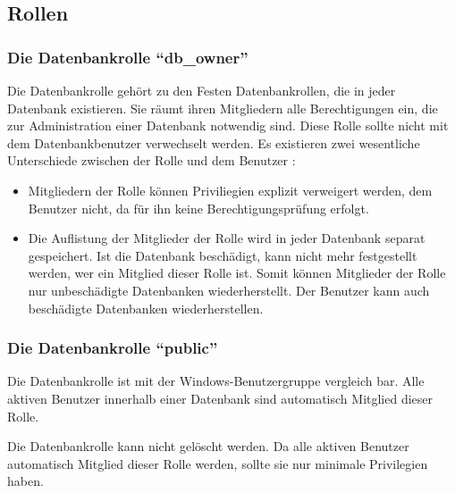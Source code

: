       \subsection{Rollen}
        \subsubsection{Die Datenbankrolle \enquote{db\_owner}}
          Die Datenbankrolle  gehört zu den Festen
          Datenbankrollen, die in jeder Datenbank existieren. Sie räumt ihren
          Mitgliedern alle Berechtigungen ein, die zur Administration einer
          Datenbank notwendig sind. Diese Rolle sollte nicht mit dem
          Datenbankbenutzer  verwechselt werden. Es existieren
          zwei wesentliche Unterschiede zwischen der Rolle
           und dem Benutzer :
          \begin{itemize}
            \item Mitgliedern der Rolle  können
            Priviliegien explizit verweigert werden, dem Benutzer 
            nicht, da für ihn keine Berechtigungsprüfung erfolgt.
            \item Die Auflistung der Mitglieder der Rolle 
            wird in jeder Datenbank separat gespeichert. Ist die Datenbank
            beschädigt, kann nicht mehr festgestellt werden, wer ein Mitglied
            dieser Rolle ist. Somit können Mitglieder der Rolle
             nur unbeschädigte Datenbanken
            wiederherstellt. Der Benutzer  kann auch beschädigte
            Datenbanken wiederherstellen.
          \end{itemize} 
          \begin{literaturinternet}
            \item \cite{gc20110407msdvdo}
          \end{literaturinternet}
        \subsubsection{Die Datenbankrolle \enquote{public}}
          Die Datenbankrolle  ist mit der
          Windows-Benutzergruppe  vergleich bar. Alle aktiven
          Benutzer innerhalb einer Datenbank sind automatisch Mitglied dieser
          Rolle.
          \begin{merke}
            Die Datenbankrolle  kann nicht gelöscht werden.
            Da alle aktiven Benutzer automatisch Mitglied dieser Rolle
            werden, sollte sie nur minimale Privilegien haben.
          \end{merke}
